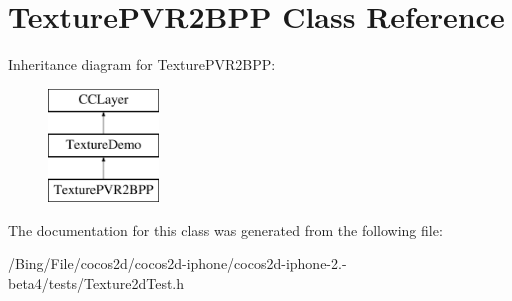 \hypertarget{interface_texture_p_v_r2_b_p_p}{\section{Texture\-P\-V\-R2\-B\-P\-P Class Reference}
\label{interface_texture_p_v_r2_b_p_p}
}
Inheritance diagram for Texture\-P\-V\-R2\-B\-P\-P\-:\begin{figure}[H]
\begin{center}
\leavevmode
\includegraphics[height=3.000000cm]{interface_texture_p_v_r2_b_p_p}
\end{center}
\end{figure}


The documentation for this class was generated from the following file\-:\begin{DoxyCompactItemize}
\item 
/\-Bing/\-File/cocos2d/cocos2d-\/iphone/cocos2d-\/iphone-\/2.-\/beta4/tests/Texture2d\-Test.\-h\end{DoxyCompactItemize}
